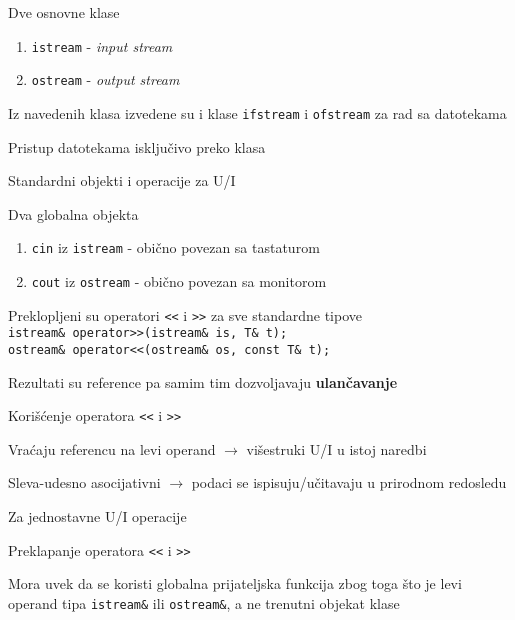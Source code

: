 \documentclass{article}
\newenvironment{xitemize}{%
    
    \itemize
    \larger
}{%
    \enditemize
}
\let\olditemize\itemize
\let\endolditemize\enditemize
\renewenvironment{itemize}{%
    \smaller
    \olditemize
}{%
    \endolditemize
}
\providecommand{\inlinecode}[1]{\texttt{#1}}
\begin{document}
\begin{xitemize}
\begin{itemize}
    \item Dve osnovne klase
    \begin{enumerate}
        \item \inlinecode{istream} - \textit{input stream}
        \item \inlinecode{ostream} - \textit{output stream}
    \end{enumerate}
    \item Iz navedenih klasa izvedene su i klase \inlinecode{ifstream} i \inlinecode{ofstream} za rad sa datotekama
    \item Pristup datotekama isključivo preko klasa
\end{itemize}
\item Standardni objekti i operacije za U/I
\begin{itemize}
    \item Dva globalna objekta
    \begin{enumerate}
        \item \inlinecode{cin} iz \inlinecode{istream} - obično povezan sa tastaturom
        \item \inlinecode{cout} iz \inlinecode{ostream} - obično povezan sa monitorom
    \end{enumerate}
    \item Preklopljeni su operatori \inlinecode{<<} i \inlinecode{>>} za sve standardne tipove\\
    \inlinecode{istream\& operator>>(istream\& is, T\& t);}\\
    \inlinecode{ostream\& operator<<(ostream\& os, const T\& t);}
    \item Rezultati su reference pa samim tim dozvoljavaju \textbf{ulančavanje}
\end{itemize}
\item Korišćenje operatora \inlinecode{<<} i \inlinecode{>>}
\begin{itemize}
    \item Vraćaju referencu na levi operand $\rightarrow$ višestruki U/I u istoj naredbi
    \item Sleva-udesno asocijativni $\rightarrow$ podaci se ispisuju/učitavaju u prirodnom redosledu
    \item Za jednostavne U/I operacije
\end{itemize}
\item Preklapanje operatora \inlinecode{<<} i \inlinecode{>>}
\begin{itemize}
    \item Mora uvek da se koristi globalna prijateljska funkcija zbog toga što je levi operand tipa \inlinecode{istream\&} ili \inlinecode{ostream\&}, a ne trenutni objekat klase

\end{itemize}
\end{xitemize}
\end{document}
